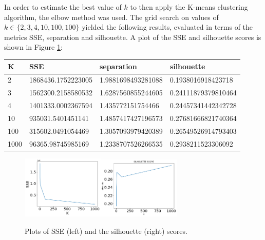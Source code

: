 \documentclass[10pt,a4paper]{report}
\begin{document}
In order to estimate the best value of $k$ to then apply the K-means clustering algorithm, the elbow method was used.
The grid search on values of $k \in \{2, 3, 4, 10, 100, 100\}$ yielded the following results, evaluated in terms of the metrics SSE, separation and silhouette.
A plot of the SSE and silhouette scores is shown in Figure \ref{kmeans_k}:
\begin{table}[h]
	\centering
	\begin{small}
		\begin{tabular}{l|p{4cm}|p{4cm}|p{4cm}}
		\textbf{K} & \textbf{SSE} & \textbf{separation} & \textbf{silhouette}\\
		\hline
		2 & 1868436.1752223005 & 1.9881698493281088 & 0.1938016918423718\\
		3 & 1562300.2158580532 & 1.6287560855244605 & 0.24111879379810464\\
		4 & 1401333.0002367594 & 1.435772151754466 & 0.24457341442342728\\
		10 & 935031.5401451141 & 1.4857417427196573 & 0.27681666821740364\\
		100 & 315602.0491054469 & 1.3057093979420389 & 0.26549526914793403\\
		1000 & 96365.98745985169 & 1.2338707526266535 & 0.2938211523306092\\
	\end{tabular}
	\end{small}
\end{table}
\begin{figure}[h]
	\centering
	\includegraphics[width=0.35\textwidth]{kmeans_sse}\includegraphics[width=0.35\textwidth]{kmeans_silhouette}
	\caption{Plots of SSE (left) and the silhouette (right) scores.}
	\label{kmeans_k}
\end{figure}
\end{document}
